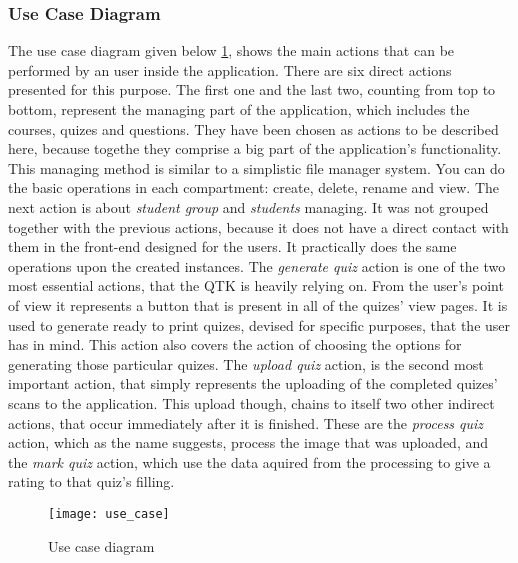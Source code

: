 \subsubsection{Use Case Diagram}
The use case diagram given below \ref{use_case_diagram}, shows the main actions that can be performed by an user inside the application. There are six direct actions presented for this purpose. The first one and the last two, counting from top to bottom, represent the managing part of the application, which includes the courses, quizes and questions. They have been chosen as actions to be described here, because togethe they comprise a big part of the application's functionality. This managing method is similar to a simplistic file manager system. You can do the basic operations in each compartment: create, delete, rename and view. The next action is about \textit{student group} and \textit{students} managing. It was not grouped together with the previous actions, because it does not have a direct contact with them in the front-end designed for the users. It practically does the same operations upon the created instances. The \textit{generate quiz} action is one of the two most essential actions, that the QTK is heavily relying on. From the user's point of view it represents a button that is present in all of the quizes' view pages. It is used to generate ready to print quizes, devised for specific purposes, that the user has in mind. This action also covers the action of choosing the options for generating those particular quizes. The \textit{upload quiz} action, is the second most important action, that simply represents the uploading of the completed quizes' scans to the application. This upload though, chains to itself two other indirect actions, that occur immediately after it is finished. These are the \textit{process quiz} action, which as the name suggests, process the image that was uploaded, and the \textit{mark quiz} action, which use the data aquired from the processing to give a rating to that quiz's filling.
\begin{figure}[!ht]
\centering
\texttt{[image: use\_case]}
\caption{Use case diagram} \label{use_case_diagram}
\end{figure}

